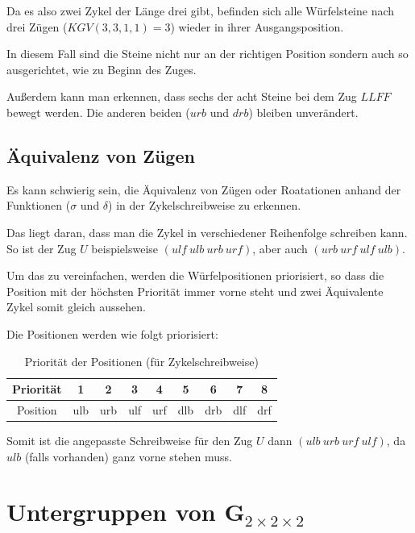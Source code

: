 \documentclass[12pt,a4paper, usenames, dvipsnames]{article}
\begin{document}
Da es also zwei Zykel der Länge drei gibt, befinden sich alle Würfelsteine nach drei Zügen ($KGV(3,3,1,1)=3$) wieder in ihrer Ausgangsposition. 

In diesem Fall sind die Steine nicht nur an der richtigen Position sondern auch so ausgerichtet, wie zu Beginn des Zuges. 


Außerdem kann man erkennen, dass sechs der acht Steine bei dem Zug $LLFF$ bewegt werden. Die anderen beiden ($urb$ und $drb$) bleiben unverändert. 

%
%
%
%
%
%
%
%
%
%
%
%
%
%
%
%
%
%
%
%
\subsection*{Äquivalenz von Zügen}


Es kann schwierig sein, die Äquivalenz von Zügen oder Roatationen anhand der Funktionen ($\sigma$ und $\delta$) in der Zykelschreibweise zu erkennen. 


Das liegt daran, dass man die Zykel in verschiedener Reihenfolge schreiben kann. So ist der Zug $U$ beispielsweise $ (ulf \ ulb \ urb \ urf)$, aber auch $(urb \ urf \ ulf \ ulb)$.


Um das zu vereinfachen, werden die Würfelpositionen priorisiert, so dass die Position mit der höchsten Priorität immer vorne steht und zwei Äquivalente Zykel somit gleich aussehen. 

Die Positionen werden wie folgt priorisiert:
\begin{table}[H]
\centering
\begin{tabular}{ccccccccc}
Priorität & 1 & 2 & 3 & 4 & 5 & 6 & 7 & 8 \\
\hline
Position  & ulb & urb & ulf & urf & dlb & drb & dlf & drf \\
\end{tabular}
\caption[Priorität der Positionen (für Zykelschreibweise)]{Priorität der Positionen (für Zykelschreibweise)}
\end{table}
Somit ist die angepasste Schreibweise für den Zug $U$ dann $(ulb \ urb \ urf \ ulf)$, da $ulb$ (falls vorhanden) ganz vorne stehen muss.

%
%
%
%
%
%
%
%
%
%
%
%
%
%
%
%
%
%
%
%
\newpage

\section{Untergruppen von G$_{2\times 2\times 2}$}
\end{document}
